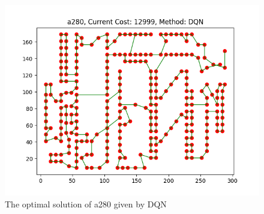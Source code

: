 \documentclass[twocolumn, a4paper]{extarticle}
\begin{document}
\begin{figure}[H]
	\centering
	\includegraphics[width=0.95\linewidth]{figure/DQN_a280}
	\caption{The optimal solution of a280 given by DQN}
	\label{fig:DQNa280}
\end{figure}
\end{document}
